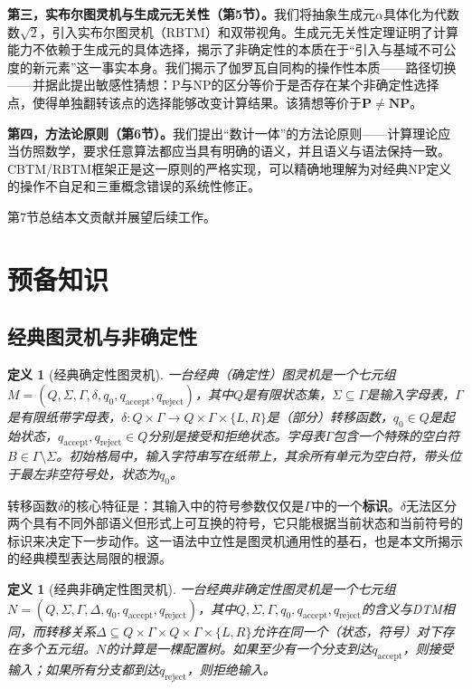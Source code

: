 \documentclass{ctexart}
\newtheorem{definition}[theorem]{定义}
\begin{document}
	\textbf{第三，实布尔图灵机与生成元无关性（第5节）。}我们将抽象生成元$\alpha$具体化为代数数$\sqrt{2}$，引入实布尔图灵机（RBTM）和双带视角。生成元无关性定理证明了计算能力不依赖于生成元的具体选择，揭示了非确定性的本质在于``引入与基域不可公度的新元素''这一事实本身。我们揭示了伽罗瓦自同构的操作性本质——路径切换——并据此提出敏感性猜想：P与NP的区分等价于是否存在某个非确定性选择点，使得单独翻转该点的选择能够改变计算结果。该猜想等价于$\mathbf{P}\neq\mathbf{NP}$。
	
	\textbf{第四，方法论原则（第6节）。}我们提出``数计一体''的方法论原则——计算理论应当仿照数学，要求任意算法都应当具有明确的语义，并且语义与语法保持一致。CBTM/RBTM框架正是这一原则的严格实现，可以精确地理解为对经典NP定义的操作不自足和三重概念错误的系统性修正。
	
	第7节总结本文贡献并展望后续工作。
	
	\section{预备知识}
	
	\subsection{经典图灵机与非确定性}
	
	\begin{definition}[经典确定性图灵机]\label{def:dtm}
		一台经典（确定性）图灵机是一个七元组$M = (Q, \Sigma, \Gamma, \delta, q_0, q_{\text{accept}}, q_{\text{reject}})$，其中$Q$是有限状态集，$\Sigma \subseteq \Gamma$是输入字母表，$\Gamma$是有限纸带字母表，$\delta: Q \times \Gamma \to Q \times \Gamma \times \{L, R\}$是（部分）转移函数，$q_0 \in Q$是起始状态，$q_{\text{accept}}, q_{\text{reject}} \in Q$分别是接受和拒绝状态。字母表$\Gamma$包含一个特殊的空白符$B \in \Gamma \setminus \Sigma$。初始格局中，输入字符串写在纸带上，其余所有单元为空白符，带头位于最左非空符号处，状态为$q_0$。
	\end{definition}
	
	转移函数$\delta$的核心特征是：其输入中的符号参数仅仅是$\Gamma$中的一个\textbf{标识}。$\delta$无法区分两个具有不同外部语义但形式上可互换的符号，它只能根据当前状态和当前符号的标识来决定下一步动作。这一语法中立性是图灵机通用性的基石，也是本文所揭示的经典模型表达局限的根源。
	
	\begin{definition}[经典非确定性图灵机]\label{def:ntm}
		一台经典非确定性图灵机是一个七元组$N = (Q, \Sigma, \Gamma, \Delta, q_0, q_{\text{accept}}, q_{\text{reject}})$，其中$Q, \Sigma, \Gamma, q_0, q_{\text{accept}}, q_{\text{reject}}$的含义与DTM相同，而转移关系$\Delta \subseteq Q \times \Gamma \times Q \times \Gamma \times \{L, R\}$允许在同一个（状态，符号）对下存在多个五元组。$N$的计算是一棵配置树。如果至少有一个分支到达$q_{\text{accept}}$，则接受输入；如果所有分支都到达$q_{\text{reject}}$，则拒绝输入。
	\end{definition}
	
\end{document}
